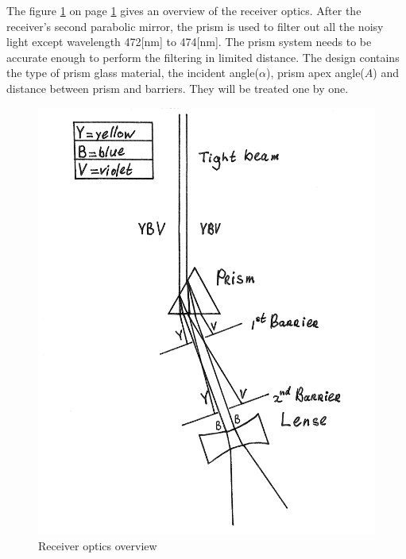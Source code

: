 The figure \ref{fig:prism} on page \ref{fig:prism} gives an overview of the receiver optics. After the receiver's second parabolic mirror, the prism is used to filter out all the noisy light except wavelength 472[nm] to 474[nm]. The prism system needs to be accurate enough to perform the filtering in limited distance. The design contains the type of prism glass material, the incident angle($\alpha$), prism apex angle($A$) and distance between prism and barriers. They will be treated one by one.

\begin{figure}[ht!]
\centering
\includegraphics[scale = 0.8]{chapters/img/Prism.png}
\caption{Receiver optics overview}
\label{fig:prism}
\end{figure} 


